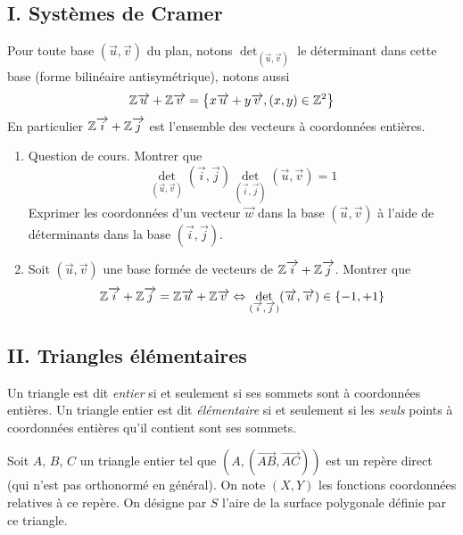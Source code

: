 \subsection*{I. Systèmes de Cramer}
Pour toute base $(\overrightarrow{u},\overrightarrow{v})$ du plan, notons $\det_{(\overrightarrow{u},\overrightarrow{v})}$ le déterminant dans cette base (forme bilinéaire antisymétrique), notons aussi
\begin{displaymath}
  \mathbb{Z}\overrightarrow{u} + \mathbb{Z}\overrightarrow{v} = \left\lbrace x\overrightarrow{u} + y\overrightarrow{v}, (x,y)\in \mathbb{Z}^2\right\rbrace 
\end{displaymath}
En particulier $\mathbb{Z}\overrightarrow{i} + \mathbb{Z}\overrightarrow{j}$ est l'ensemble des vecteurs à coordonnées entières.
\begin{enumerate}
 \item Question de cours. Montrer que
 \begin{displaymath}
   \det_{(\overrightarrow{u},\overrightarrow{v})}(\overrightarrow{i},\overrightarrow{j})
   \det_{(\overrightarrow{i},\overrightarrow{j})}(\overrightarrow{u},\overrightarrow{v}) = 1
 \end{displaymath}
 Exprimer les coordonnées d'un vecteur $\overrightarrow{w}$ dans la base $(\overrightarrow{u},\overrightarrow{v})$ à l'aide de déterminants dans la base $(\overrightarrow{i},\overrightarrow{j})$.
 \item Soit $(\overrightarrow{u},\overrightarrow{v})$ une base formée de vecteurs de $\mathbb{Z}\overrightarrow{i} + \mathbb{Z}\overrightarrow{j}$. Montrer que 
 \begin{displaymath}
   \mathbb{Z}\overrightarrow{i} + \mathbb{Z}\overrightarrow{j} = \mathbb{Z}\overrightarrow{u} + \mathbb{Z}\overrightarrow{v}
   \Leftrightarrow \det_{(\overrightarrow{i},\overrightarrow{j})}(\overrightarrow{u},\overrightarrow{v})\in\left\lbrace -1, +1\right\rbrace 
 \end{displaymath}

\end{enumerate}

\subsection*{II. Triangles élémentaires}
Un triangle est dit \emph{entier} si et seulement si ses sommets sont à coordonnées entières. Un triangle entier est dit \emph{élémentaire} si et seulement  si les \emph{seuls} points à coordonnées entières qu'il contient sont ses sommets.

Soit $A$, $B$, $C$ un triangle entier tel que $(A,(\overrightarrow{AB},\overrightarrow{AC}))$ est un repère direct (qui n'est pas orthonormé en général).  On note $(X,Y)$ les fonctions coordonnées relatives à ce repère. On désigne par $S$ l'aire de la surface polygonale définie par ce triangle.

